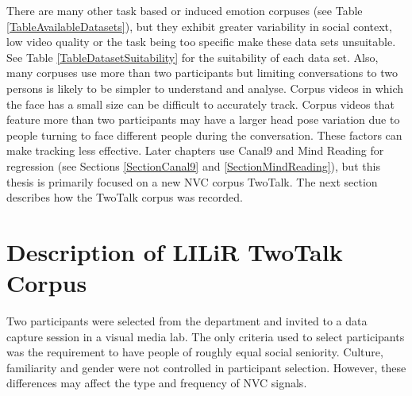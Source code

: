 There are many other task based or induced emotion corpuses (see Table \ref{TableAvailableDatasets}), but they exhibit greater variability in social context, low video quality or the task being too specific make these data sets unsuitable. See Table \ref{TableDatasetSuitability} for the suitability of each data set. Also, many corpuses use more than two participants but limiting conversations to two persons is likely to be simpler to understand and analyse. Corpus videos in which the face has a small size can be difficult to accurately track. Corpus videos that feature more than two participants may have a larger head pose variation due to people turning to face different people during the conversation. These factors can make tracking less effective. Later chapters use Canal9 and Mind Reading for regression (see Sections \ref{SectionCanal9} and \ref{SectionMindReading}), but this thesis is primarily focused on a new \ac{NVC} corpus TwoTalk.
The next section describes how the TwoTalk corpus was recorded.


\section{Description of LILiR TwoTalk Corpus}
\label{SectionDataCapture}
\label{SectionDescriptionOfTwoTalkCorpus}

Two participants were selected from the department and invited to a data capture session in a visual media lab. The only criteria used to select participants was the requirement to have people of roughly equal social seniority. Culture, familiarity and gender were not controlled in participant selection. However, these differences may affect the type and frequency of \ac{NVC} signals.

